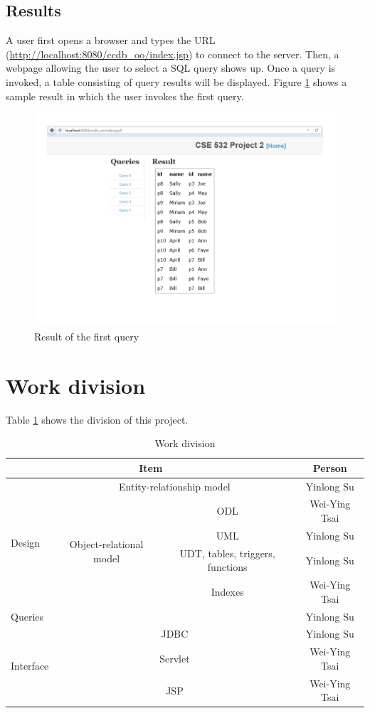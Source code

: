 \documentclass[11pt]{article}
\begin{document}
\subsection{Results}
A user first opens a browser and types the URL (\url{http://localhost:8080/ccdb_oo/index.jsp}) to connect to the server. Then, a webpage allowing the user to select a SQL query shows up. Once a query is invoked, a table consisting of query results will be displayed. Figure \ref{fig:resultccdb} shows a sample result in which the user invokes the first query.

\begin{figure}[!htp]
\centering
\includegraphics[scale=0.8]{result.pdf}
\caption{Result of the first query}
\label{fig:resultccdb}
\end{figure}

\section{Work division}
Table \ref{tab:workdivision} shows the division of this project.

\begin{table}[!htbp]
\centering
\label{tab:workdivision}
\caption{Work division}
\begin{tabular}{|l|c|c||c|}
\hline
\multicolumn{3}{|c||}{Item} & Person \\
\hline
\multirow{5}{*}{Design} & \multicolumn{2}{c||}{Entity-relationship model} & Yinlong Su \\
\cline{2-4}
& \multirow{4}{*}{Object-relational model} & ODL & Wei-Ying Tsai \\
\cline{3-4}
& & UML & Yinlong Su \\
\cline{3-4}
& & UDT, tables, triggers, functions & Yinlong Su \\
\cline{3-4}
& & Indexes & Wei-Ying Tsai \\
\hline
\multicolumn{3}{|l||}{Queries} & Yinlong Su \\
\hline
\multirow{3}{*}{Interface} & \multicolumn{2}{c||}{JDBC} & Yinlong Su \\
\cline{2-4}
& \multicolumn{2}{c||}{Servlet} & Wei-Ying Tsai \\
\cline{2-4}
& \multicolumn{2}{c||}{JSP} & Wei-Ying Tsai \\
\hline
\end{tabular}
\end{table}
\end{document}

